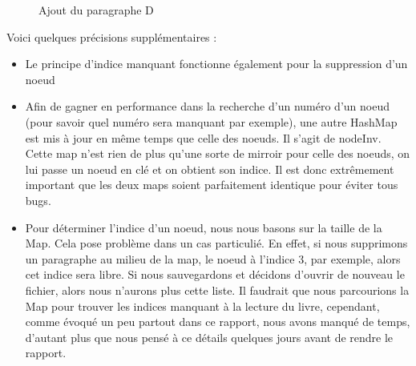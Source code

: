 			\begin{figure}[H]
				\begin{center}
				\end{center}
				\caption{Ajout du paragraphe D}
			\end{figure}

			Voici quelques précisions supplémentaires :

			\begin{itemize}
				\item{Le principe d'indice manquant fonctionne également pour la suppression d'un noeud}
				\item{Afin de gagner en performance dans la recherche d'un numéro d'un noeud (pour savoir quel numéro sera manquant par exemple), une autre HashMap est mis à jour en même temps que celle des noeuds. Il s'agit de nodeInv. Cette map n'est rien de plus qu'une sorte de mirroir pour celle des noeuds, on lui passe un noeud en clé et on obtient son indice. Il est donc extrêmement important que les deux maps soient parfaitement identique pour éviter tous bugs.}
				\item{\label{subsec:noeud_delete_missing_index}Pour déterminer l'indice d'un noeud, nous nous basons sur la taille de la Map. Cela pose problème dans un cas particulié. En effet, si nous supprimons un paragraphe au milieu de la map, le noeud à l'indice 3, par exemple, alors cet indice sera libre. Si nous sauvegardons et décidons d'ouvrir de nouveau le fichier, alors nous n'aurons plus cette liste. Il faudrait que nous parcourions la Map pour trouver les indices manquant à la lecture du livre, cependant, comme évoqué un peu partout dans ce rapport, nous avons manqué de temps, d'autant plus que nous pensé à ce détails quelques jours avant de rendre le rapport.}
			\end{itemize}

